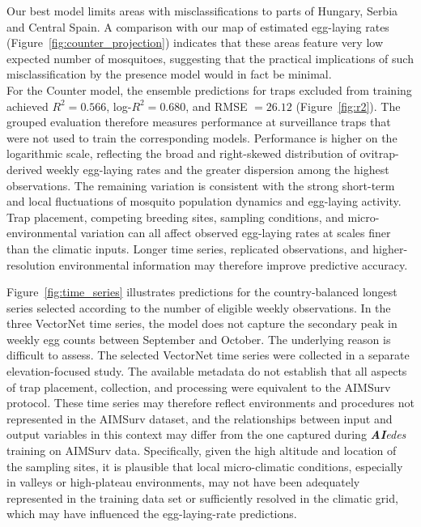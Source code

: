 \documentclass[preprint,12pt]{elsarticle}
\begin{document}
Our best model limits areas with misclassifications to parts of Hungary, Serbia and Central Spain. A comparison with our map of estimated egg-laying rates (Figure~\ref{fig:counter_projection}) indicates that these areas feature very low expected number of mosquitoes, suggesting that the practical implications of such misclassification by the presence model would in fact be minimal.
\\

For the Counter model, the ensemble predictions for traps excluded from training achieved $R^2=0.566$, log-$R^2=0.680$, and RMSE $=26.12$ (Figure~\ref{fig:r2}). The grouped evaluation therefore measures performance at surveillance traps that were not used to train the corresponding models. Performance is higher on the logarithmic scale, reflecting the broad and right-skewed distribution of ovitrap-derived weekly egg-laying rates and the greater dispersion among the highest observations.
The remaining variation is consistent with the strong short-term and local fluctuations of mosquito population dynamics and egg-laying activity. Trap placement, competing breeding sites, sampling conditions, and micro-environmental variation can all affect observed egg-laying rates at scales finer than the climatic inputs. Longer time series, replicated observations, and higher-resolution environmental information may therefore improve predictive accuracy.

Figure~\ref{fig:time_series} illustrates predictions for the country-balanced longest series selected according to the number of eligible weekly observations. In the three VectorNet time series, the model does not capture the secondary peak in weekly egg counts between September and October. The underlying reason is difficult to assess. The selected VectorNet time series were collected in a separate elevation-focused study. The available metadata do not establish that all aspects of trap placement, collection, and processing were equivalent to the AIMSurv protocol. These time series may therefore reflect environments and procedures not represented in the AIMSurv dataset, and the relationships between input and output variables in this context may differ from the one captured during \textit{\textbf{AI}edes} training on AIMSurv data. Specifically, given the high altitude and location of the sampling sites, it is plausible that local micro-climatic conditions, especially in valleys or high-plateau environments, may not have been adequately represented in the training data set or sufficiently resolved in the climatic grid, which may have influenced the egg-laying-rate predictions.
\end{document}
